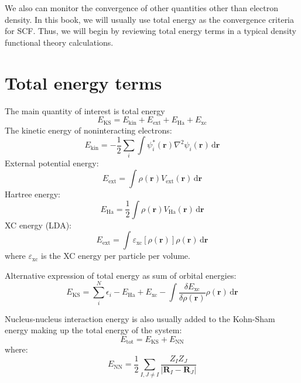 We also can monitor the convergence of other quantities other than electron density.
In this book, we will usually use total energy as the convergence criteria for SCF.
Thus, we will begin by reviewing total energy terms in a typical density functional
theory calculations.

\section{Total energy terms}

The main quantity of interest is total energy
\begin{equation}
E_{\mathrm{KS}} = E_{\mathrm{kin}} + E_{\mathrm{ext}}
+ E_{\mathrm{Ha}} + E_{\mathrm{xc}}
\end{equation}
%
The kinetic energy of noninteracting electrons:
\begin{equation}
E_{\mathrm{kin}} = -\frac{1}{2}\sum_{i} \int \psi_{i}^{*}(\mathbf{r}) \nabla^2 \psi_{i}(\mathbf{r})
\,\mathrm{d}\mathbf{r}
\end{equation}
%
External potential energy:
\begin{equation}
E_{\mathrm{ext}} = \int \rho(\mathbf{r}) V_{\mathrm{ext}}(\mathbf{r})
\,\mathrm{d}\mathbf{r}
\end{equation}
%
Hartree energy:
\begin{equation}
E_{\mathrm{Ha}} = \frac{1}{2} \int \rho(\mathbf{r}) V_{\mathrm{Ha}}(\mathbf{r})
\,\mathrm{d}\mathbf{r}
\end{equation}
%
XC energy (LDA):
\begin{equation}
E_{\mathrm{ext}} = \int \varepsilon_{\mathrm{xc}}[\rho(\mathbf{r})] \rho(\mathbf{r})
\,\mathrm{d}\mathbf{r}
\end{equation}
where $\varepsilon_{\mathrm{xc}}$ is the XC energy per particle per volume.

Alternative expression of total energy as sum of orbital energies:
\begin{equation}
E_{\mathrm{KS}} = \sum_{i}^{N} \epsilon_{i} - E_{\mathrm{Ha}} + E_{\mathrm{xc}}
- \int \frac{\delta E_{\mathrm{xc}}}{\delta \rho(\mathbf{r})} \rho(\mathbf{r})
\,\mathrm{d}\mathbf{r}
\end{equation}

Nucleus-nucleus interaction energy is also usually added to the Kohn-Sham energy
making up the total energy of the system:
\begin{equation}
E_{\mathrm{tot}} = E_{\mathrm{KS}} + E_{\mathrm{NN}}
\end{equation}
where:
\begin{equation}
E_{\mathrm{NN}} = \frac{1}{2} \sum_{I,J \neq I}
\frac{Z_{I} Z_{J}}{\left| \mathbf{R}_{I} - \mathbf{R}_{J} \right|}
\end{equation}



